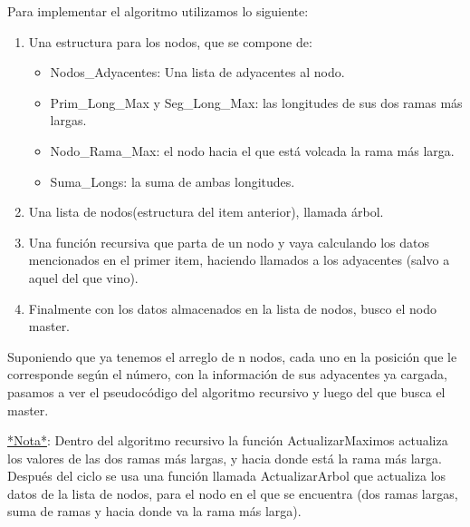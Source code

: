 Para implementar el algoritmo utilizamos lo siguiente:
\begin{enumerate}
\item Una estructura para los nodos, que se compone de:


\begin{itemize}
\item Nodos\_Adyacentes: Una lista de adyacentes al nodo.
\item Prim\_Long\_Max y Seg\_Long\_Max: las longitudes de sus dos ramas más largas. 
\item Nodo\_Rama\_Max: el nodo hacia el que está volcada la rama más larga. 
\item Suma\_Longs: la suma de ambas longitudes.
\end{itemize}



\item Una lista de nodos(estructura del item anterior), llamada árbol.
\item Una función recursiva que parta de un nodo y vaya calculando los datos mencionados en el primer item, haciendo llamados a los adyacentes (salvo a aquel del que vino).
\item Finalmente con los datos almacenados en la lista de nodos, busco el nodo master.
\end{enumerate}

 Suponiendo que ya tenemos el arreglo de n nodos, cada uno en la posición que le corresponde según el número, con la información de sus adyacentes ya cargada, pasamos a ver el pseudocódigo del algoritmo recursivo y luego del que busca el master.

 \underline{*Nota*}: Dentro del algoritmo recursivo la función ActualizarMaximos actualiza los valores de las dos ramas más largas, y hacia donde está la rama más larga.
 Después del ciclo se usa una función llamada ActualizarArbol que actualiza los datos de la lista de nodos, para el nodo en el que se encuentra (dos ramas largas, suma de ramas y hacia donde va la rama más larga).
 
